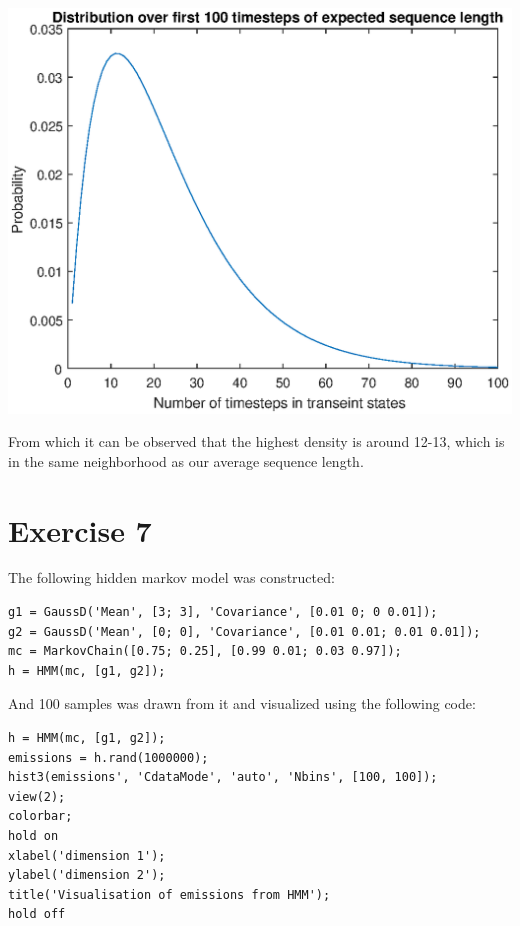 \documentclass[]{article}
\let\origfigure\figure
\let\endorigfigure\endfigure
\renewenvironment{figure}[1][2] {
    \expandafter\origfigure\expandafter[H]
} {
    \endorigfigure
}
\begin{document}
\begin{figure}
\centering
\includegraphics{Result_Pics/lenDistr.eps}
\caption{Distribution of expected sequence length}
\end{figure}

From which it can be observed that the highest density is around 12-13,
which is in the same neighborhood as our average sequence length.

\newpage

\hypertarget{exercise-7}{%
\section{Exercise 7}\label{exercise-7}}

The following hidden markov model was constructed:

\begin{verbatim}
g1 = GaussD('Mean', [3; 3], 'Covariance', [0.01 0; 0 0.01]);
g2 = GaussD('Mean', [0; 0], 'Covariance', [0.01 0.01; 0.01 0.01]);
mc = MarkovChain([0.75; 0.25], [0.99 0.01; 0.03 0.97]);
h = HMM(mc, [g1, g2]);
\end{verbatim}

And 100 samples was drawn from it and visualized using the following
code:

\begin{verbatim}
h = HMM(mc, [g1, g2]);
emissions = h.rand(1000000);
hist3(emissions', 'CdataMode', 'auto', 'Nbins', [100, 100]);
view(2);
colorbar;
hold on
xlabel('dimension 1');
ylabel('dimension 2');
title('Visualisation of emissions from HMM');
hold off
\end{verbatim}
\end{document}
